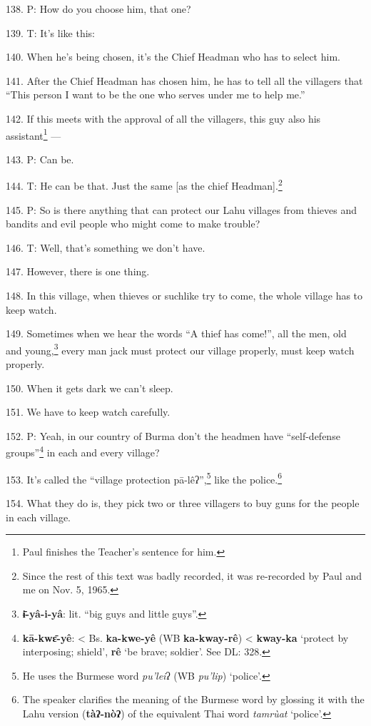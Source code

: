138. P: How do you choose him, that one?

139. T: It's like this:

140. When he's being chosen, it's the Chief Headman who has to select him.

141. After the Chief Headman has chosen him, he has to tell all the villagers that
``This person I want to be the one who serves under me to help me.''

142. If this meets with the approval of all the villagers, this guy also his assistant\footnote{Paul finishes the Teacher's sentence for him.}
---

143. P: Can be.

144. T: He can be that. Just the same [as the chief Headman].\footnote{Since the rest of this text was badly recorded, it was re-recorded by Paul and me on Nov. 5, 1965.}

145. P: So is there anything that can protect our Lahu villages from thieves and
bandits and evil people who might come to make trouble?

146. T: Well, that's something we don't have.

147. However, there is one thing.

148. In this village, when thieves or suchlike try to come, the whole village has
to keep watch.

149. Sometimes when we hear the words ``A thief has come!'', all the men, old and
young,\footnote{\textbf{ɨ̄-yâ-i-yâ}: lit. ``big guys and little guys''.} every man jack must protect our village properly, must keep watch properly.

150. When it gets dark we can't sleep.

151. We have to keep watch carefully.

152. P: Yeah, in our country of Burma don't the headmen have ``self-defense groups''\footnote{\textbf{kā-kwɛ̄-yê}: < Bs. \textbf{ka-kwe-yê} (WB \textbf{ka-kway-rê}) < \textbf{kway-ka} `protect by interposing; shield', \textbf{rê} `be brave; soldier'. See DL: 328.}
in each and every village?

153. It's called the ``village protection pā-lêʔ'',\footnote{He uses the Burmese word \textit{pu'lei}ʔ (WB \textit{pu'lip}) `police'.} like the police.\footnote{The speaker clarifies the meaning of the Burmese word by glossing it with the Lahu version (\textbf{tàʔ-nòʔ}) of the equivalent Thai word \textit{tamrùat }`police'.}

154. What they do is, they pick two or three villagers to buy guns for the people
in each village.

